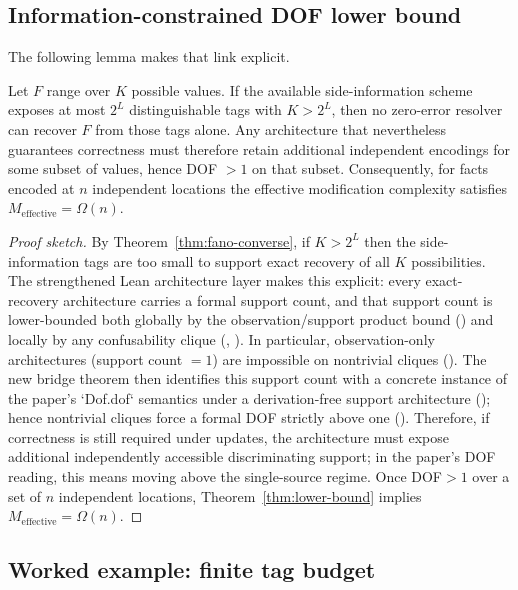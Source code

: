 \subsection{Information-constrained DOF lower bound}
\label{sec:info-dof}

The following lemma makes that link explicit.

\begin{lemma}\label{lem:info-dof}
Let $F$ range over $K$ possible values. If the available side-information scheme exposes at most $2^L$ distinguishable tags with $K>2^L$, then no zero-error resolver can recover $F$ from those tags alone. Any architecture that nevertheless guarantees correctness must therefore retain additional independent encodings for some subset of values, hence DOF $>1$ on that subset. Consequently, for facts encoded at $n$ independent locations the effective modification complexity satisfies $M_{\text{effective}}=\Omega(n)$.
\end{lemma}

\begin{proof}[Proof sketch]
By Theorem~\ref{thm:fano-converse}, if $K>2^L$ then the side-information tags are too small to support exact recovery of all $K$ possibilities. The strengthened Lean architecture layer makes this explicit: every exact-recovery architecture carries a formal support count, and that support count is lower-bounded both globally by the observation/support product bound () and locally by any confusability clique (, ). In particular, observation-only architectures (support count $=1$) are impossible on nontrivial cliques (). The new bridge theorem then identifies this support count with a concrete instance of the paper's `Dof.dof` semantics under a derivation-free support architecture (); hence nontrivial cliques force a formal DOF strictly above one (). Therefore, if correctness is still required under updates, the architecture must expose additional independently accessible discriminating support; in the paper's DOF reading, this means moving above the single-source regime. Once DOF$>1$ over a set of $n$ independent locations, Theorem~\ref{thm:lower-bound} implies $M_{\text{effective}}=\Omega(n)$.
\end{proof}

\subsection{Worked example: finite tag budget}
\label{sec:worked-mi}

